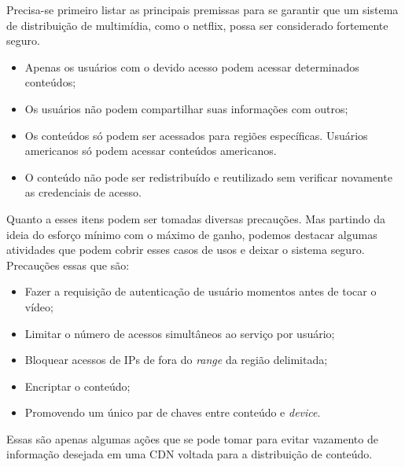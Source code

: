 Precisa-se primeiro listar as principais premissas para se garantir que um sistema de distribui\c{c}\~ao de multim\'idia, como o netflix, possa ser considerado fortemente seguro.
\begin{itemize}
\item Apenas os usu\'arios com o devido acesso podem acessar determinados conte\'udos;
\item Os usu\'arios n\~ao podem compartilhar suas informa\c{c}\~oes com outros;
\item Os conte\'udos s\'o podem ser acessados para regi\~oes espec\'ificas. Usu\'arios americanos s\'o podem acessar conte\'udos americanos.
\item O conte\'udo n\~ao pode ser redistribu\'ido e reutilizado sem verificar novamente as credenciais de acesso.	 
\end{itemize}

Quanto a esses itens podem ser tomadas diversas precau\c{c}\~oes. Mas partindo da ideia do esforço m\'inimo com o m\'aximo de ganho, podemos destacar algumas atividades que podem cobrir esses casos de usos e deixar o sistema seguro. Precau\c{c}\~oes essas que s\~ao:
\begin{itemize}
\item Fazer a requisi\c{c}\~ao de autentica\c{c}\~ao de usu\'ario momentos antes de tocar o v\'ideo;
\item Limitar o n\'umero de acessos simult\^aneos ao servi\c{c}o por usu\'ario;
\item Bloquear acessos de IPs de fora do \textit{range} da regi\~ao delimitada;
\item Encriptar o conte\'udo;
\item Promovendo um \'unico par de chaves entre conte\'udo e \textit{device}.
\end{itemize}

Essas s\~ao apenas algumas a\c{c}\~oes que se pode tomar para evitar vazamento de informa\c{c}\~ao desejada em uma CDN voltada para a distribui\c{c}\~ao de conte\'udo.

